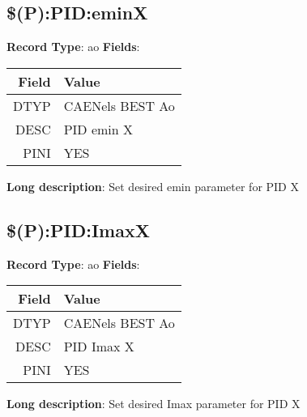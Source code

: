 \subsection{\$(P):PID:eminX}
\textbf{Record Type}: ao \newline \newline 
\textbf{Fields}: \newline 
\begin{tabularx}{0.7\linewidth}{|r|X|}
\hline Field & Value \\
\hline
\hline
DTYP & CAENels BEST Ao\\
\hline
DESC & PID emin X\\
\hline
PINI & YES\\
\hline
\end{tabularx}
\newline \newline \newline
\textbf{Long description}: \newline 
 Set desired emin parameter for PID X
\newline \newline

\subsection{\$(P):PID:ImaxX}
\textbf{Record Type}: ao \newline \newline 
\textbf{Fields}: \newline 
\begin{tabularx}{0.7\linewidth}{|r|X|}
\hline Field & Value \\
\hline
\hline
DTYP & CAENels BEST Ao\\
\hline
DESC & PID Imax X\\
\hline
PINI & YES\\
\hline
\end{tabularx}
\newline \newline \newline
\textbf{Long description}: \newline 
 Set desired Imax parameter for PID X
\newline \newline

